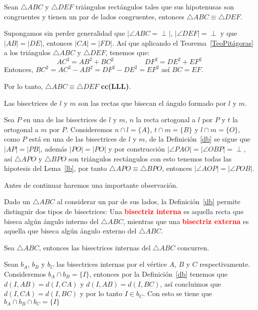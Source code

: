 \begin{lema}\label{lb}
Sean $\triangle ABC$ y $\triangle DEF$ triángulos rectángulos tales que sus hipotenusas son congruentes y tienen un par de lados congruentes, entonces $\triangle ABC\equiv\triangle DEF$.
\end{lema}

\begin{pba}
Supongamos sin perder generalidad que $|\angle ABC=\perp|$, $|\angle DEF|=\perp$ y que $|AB|=|DE|$, entonces $|CA|=|FD|$. Así que aplicando el Teorema~\ref{TeoPitágoras} a los triángulos $\triangle ABC$ y $\triangle DEF$, tenemos que: 
$$AC^{2}=AB^{2}+BC^{2}\;\;\;\;\;\;\;\;\;\;\;\;\;\;\;\;DF^{2}=DE^{2}+EF^{2}$$
Entonces, $BC^{2}=AC^{2}-AB^{2}=DF^{2}-DE^{2}=EF^{2}$ así $BC=EF$.

Por lo tanto, $\triangle ABC\equiv\triangle DEF$ \textbf{cc(LLL)}.
\end{pba}

\begin{teo}
Las bisectrices de $l$ y $m$ son las rectas que bisecan el ángulo formado por $l$ y $m$.
\end{teo}
\begin{dem}
Sea $P$ en una de las bisectrices de $l$ y $m$, $n$ la recta ortogonal a $l$ por $P$ y $t$ la ortogonal a $m$ por $P$. Consideremos $n\cap l=\{A\}$, $t\cap m=\{B\}$ y $l\cap m=\{O\}$, como $P$ está en una de las bisectrices de $l$ y $m$, de la Definición~\ref{db} se sigue que $|AP|=|PB|$, además $|PO|=|PO|$ y por construcción $|\angle PAO|=|\angle OBP|=\perp$, así $\triangle APO$ y $\triangle BPO$  son triángulos rectángulos con esto tenemos todas las hipotesis del Lema~\ref{lb}, por tanto $\triangle APO\equiv\triangle BPO$, entonces $|\angle AOP|=|\angle POB|$.
\end{dem}

Antes de continuar haremos una importante observación. 
\begin{obs}
Dado un $\triangle ABC$ al considerar un par de sus lados, la Definición~\ref{db} permite distinguir dos tipos de bisectrices: Una \textcolor{red}{\bf bisectriz interna} es aquella recta que biseca algún ángulo interno del $\triangle ABC$, mientras que una \textcolor{red}{\bf bisectriz externa} es aquella que biseca algún ángulo externo del $\triangle ABC$.
\end{obs}

\begin{teo}
Sea $\triangle ABC$, entonces las bisectrices internas del $\triangle ABC$ concurren. 
\end{teo}
\begin{dem}
Sean $b_{A}$, $b_{B}$ y $b_{C}$ las bisectrices internas por el vértice $A$, $B$ y $C$ respectivamente. Consideremos $b_{A}\cap b_{B}=\{I\}$, entonces por la Definición~\ref{db} tenemos que $d(I,AB)=d(I,CA)$ y $d(I,AB)=d(I,BC)$, así concluimos que $d(I,CA)=d(I,BC)$ y por lo tanto $I\in b_{C}$.
Con esto se tiene que $b_{A}\cap b_{B}\cap b_{C}=\{I\}$
\end{dem}

